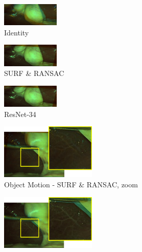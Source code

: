 \begin{landscape}
\begin{figure}
\centering
\begin{subfigure}[b]{0.3\textwidth}
    \centering
    \includegraphics[width=0.3\textwidth]{img/homography_blends/blend_identity_strong_motion.png}
    \caption{Identity}
\end{subfigure}
\begin{subfigure}[b]{0.3\textwidth}
    \centering
    \includegraphics[width=0.3\textwidth]{img/homography_blends/blend_surf_strong_motion.png}
    \caption{SURF \& RANSAC}
\end{subfigure}
\begin{subfigure}[b]{0.3\textwidth}
    \centering
    \includegraphics[width=0.3\textwidth]{img/homography_blends/blend_resnet_34_strong_motion.png}
    \caption{ResNet-34}
\end{subfigure}
\begin{subfigure}[b]{0.5\textwidth}
    \centering
    \includegraphics[width=0.5\textwidth]{img/homography_blends/blend_surf_zoom.png}
    \caption{Object Motion - SURF \& RANSAC, zoom}
\end{subfigure}
\begin{subfigure}[b]{0.5\textwidth}
    \centering
    \includegraphics[width=0.5\textwidth]{img/homography_blends/blend_resnet_34_zoom.png}

\end{subfigure}
\end{figure}
\end{landscape}

